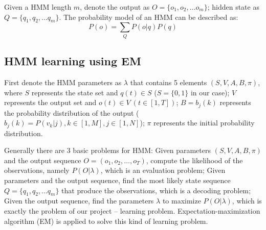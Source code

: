 \documentclass[conference]{IEEEtran}
\begin{document}
Given a HMM length $m$, denote the output as $O=\{o_1, o_2,\dots o_m\}$; hidden state as $Q=\{q_1, q_2,\dots q_m\}$. The probability model of an HMM can be described as:
\begin{equation}
P(o)=\sum_{Q}P(o|q)P(q)
\end{equation}

\subsection{HMM learning using EM}
First denote the HMM parameters as $\lambda$ that contains 5 elements $(S,V,A,B,\pi)$, where $S$ represents the state set and $q(t)\in S$ ($S=\{0,1\}$ in our case); $V$ represents the output set and $o(t)\in V\ (t\in[1,T])$; $B=b_j(k)$ represents the probability distribution of the output ($b_j(k)=P(v_k|j),k\in[1,M],j\in[1,N]$); $\pi$ represents the initial probability distribution.

Generally there are 3 basic problems for HMM\cite{hmm4}: Given parameters $(S,V,A,B,\pi)$ and the output sequence $O=(o_1,o_2,\dots,o_T)$, compute the likelihood of the observations, namely $P(O|\lambda)$, which is an evaluation problem; Given parameters and the output sequence, find the most likely state sequence $Q=\{q_1, q_2,\dots q_m\}$ that produce the observations, which is a decoding problem; Given the output sequence, find the parameters $\lambda$ to maximize $P(O|\lambda)$, which is exactly the problem of our project -- learning problem. Expectation-maximization algorithm (EM) is applied to solve this kind of learning problem.
\end{document}
